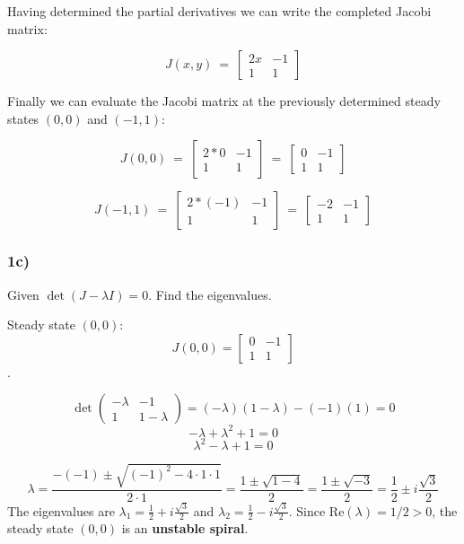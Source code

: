 \documentclass[]{scrartcl}
\begin{document}
Having determined the partial derivatives we can write the completed Jacobi matrix:

\[
J(x,y) ~=~
\begin{bmatrix}
  2x & -1 \\[1ex] %
  1 & 1
\end{bmatrix}
\]

Finally we can evaluate the Jacobi matrix at the previously determined steady states $(0,0)$ and $(-1,1)$:

\[
J(0,0) 
~=~
\begin{bmatrix}
  2*0 & -1 \\[1ex] %
  1 & 1
\end{bmatrix}
~=~
\begin{bmatrix}
  0 & -1 \\[1ex] %
  1 & 1
\end{bmatrix}
\]

\[
J(-1,1) 
~=~
\begin{bmatrix}
  2*(-1) & -1 \\[1ex] %
  1 & 1
\end{bmatrix}
~=~
\begin{bmatrix}
  -2 & -1 \\[1ex] %
  1 & 1
\end{bmatrix}
\]


\subsubsection*{1c)}

Given $\det(J - \lambda I) = 0$.
Find the eigenvalues.

Steady state $(0,0)$:
$$J(0,0) = \begin{bmatrix} 0 & -1 \\ 1 & 1 \end{bmatrix}$$.

$$\det \begin{pmatrix} -\lambda & -1 \\ 1 & 1-\lambda \end{pmatrix} = (-\lambda)(1-\lambda) - (-1)(1) = 0$$
$$-\lambda + \lambda^2 + 1 = 0$$
$$\lambda^2 - \lambda + 1 = 0$$

$$\lambda = \frac{-(-1) \pm \sqrt{(-1)^2 - 4 \cdot 1 \cdot 1}}{2 \cdot 1} = \frac{1 \pm \sqrt{1-4}}{2} = \frac{1 \pm \sqrt{-3}}{2} = \frac{1}{2} \pm i\frac{\sqrt{3}}{2}$$
The eigenvalues are $\lambda_1 = \frac{1}{2} + i\frac{\sqrt{3}}{2}$ and $\lambda_2 = \frac{1}{2} - i\frac{\sqrt{3}}{2}$.
Since $\mathrm{Re}(\lambda) = 1/2 > 0$, the steady state $(0,0)$ is an \textbf{unstable spiral}.
\end{document}

